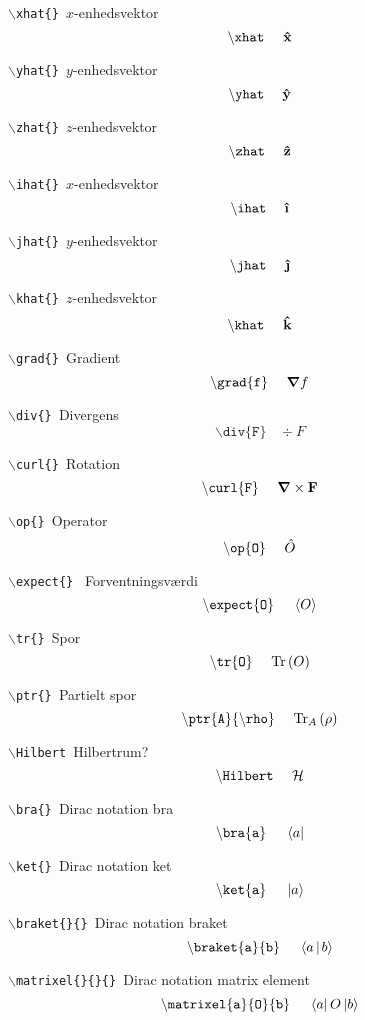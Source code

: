 \documentclass[a4paper,hidelinks,11pt]{memoir}
\begin{document}
\texttt{$\backslash$xhat\{\} }$x$-enhedsvektor
$$
\mathtt{\backslash xhat}~~~~\mathbf{\hat{x}}
$$

\texttt{$\backslash$yhat\{\} }$y$-enhedsvektor
$$
\mathtt{\backslash yhat}~~~~\mathbf{\hat{y}}
$$

\texttt{$\backslash$zhat\{\} }$z$-enhedsvektor
$$
\mathtt{\backslash zhat}~~~~\mathbf{\hat{z}}
$$

\texttt{$\backslash$ihat\{\} }$x$-enhedsvektor
$$
\mathtt{\backslash ihat}~~~~\ihat
$$

\texttt{$\backslash$jhat\{\} }$y$-enhedsvektor
$$
\mathtt{\backslash jhat}~~~~\jhat
$$

\texttt{$\backslash$khat\{\} }$z$-enhedsvektor
$$
\mathtt{\backslash khat}~~~~\mathbf{\hat{k}}
$$

\texttt{$\backslash$grad\{\} }Gradient
$$
\mathtt{\backslash grad\{ f\} }~~~~\mbox{\boldmath$ \nabla $} f
$$

\texttt{$\backslash$div\{\} }Divergens
$$
\mathtt{\backslash div\{ F\} }~~~~\div{F}
$$

\texttt{$\backslash$curl\{\} }Rotation
$$
\mathtt{\backslash curl\{ F\} }~~~~\mbox{\boldmath$ \nabla $} \times \mathbf{F}
$$

\texttt{$\backslash$op\{\} }Operator
$$
\mathtt{\backslash op\{ O\} }~~~~\hat O
$$

\texttt{$\backslash$expect\{\} } Forventningsværdi
$$
\mathtt{\backslash expect\{ O\} }~~~~\left< O \right>
$$

\texttt{$\backslash$tr\{\} }Spor
$$
\mathtt{\backslash tr\{ O\} }~~~~\text{Tr}\left(O\right)
$$

\texttt{$\backslash$ptr\{\} }Partielt spor
$$
\mathtt{\backslash ptr\{ A\}\{ \backslash rho\} }~~~~\text{Tr}_{A}\left(\rho\right)
$$

\texttt{$\backslash$Hilbert }Hilbertrum?
$$
\mathtt{\backslash Hilbert}~~~~\mathcal{H}
$$

\texttt{$\backslash$bra\{\} }Dirac notation bra
$$
\mathtt{\backslash bra\{ a\}}~~~~\left< a \right|
$$

\texttt{$\backslash$ket\{\} }Dirac notation ket
$$
\mathtt{\backslash ket\{ a\}}~~~~\left| a \right>
$$

\texttt{$\backslash$braket\{\}\{\} }Dirac notation braket
$$
\mathtt{\backslash braket\{ a\}\{ b\}}~~~~\braket{a}{b}
$$

\texttt{$\backslash$matrixel\{\}\{\}\{\} }Dirac notation matrix element
$$
\mathtt{\backslash matrixel\{ a\}\{ O\}\{ b\}}~~~~\matrixel{a}{O}{b}
$$
\end{document}
